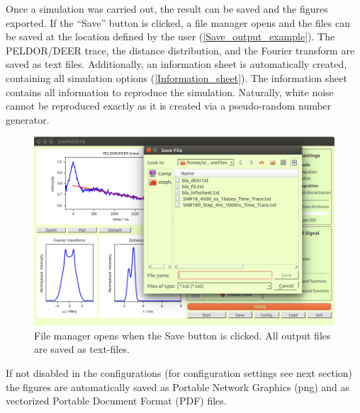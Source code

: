 \documentclass[pdftex,bezier,german,a4,twoside, headexclude,12pt,nochapterprefix, titlepage]{extarticle}
\begin{document}
Once a simulation was carried out, the result can be saved and the figures exported. If the ``Save'' button is clicked, a file manager opens and the files can be saved at the  location defined by the user (\autoref{Save_output_example}). The PELDOR/DEER trace, the distance distribution, and the Fourier transform are saved as text files. Additionally, an information sheet is automatically created, containing all simulation options (\autoref{Information_sheet}). The information sheet contains all information to reproduce the simulation. Naturally, white noise cannot be reproduced exactly as it is created via a pseudo-random number generator. 

\begin{figure}[!htb]
\centering
\includegraphics[scale=0.5]{Save_output_example.png}
    \caption{File manager opens when the Save button is clicked. All output files are saved as text-files.
    }
\label{Save_output_example}
\end{figure} 

If not disabled in the configurations (for configuration settings see next section) the figures are automatically saved as Portable Network Graphics (png) and  as vectorized Portable Document Format (PDF) files.

\newpage
\end{document}
